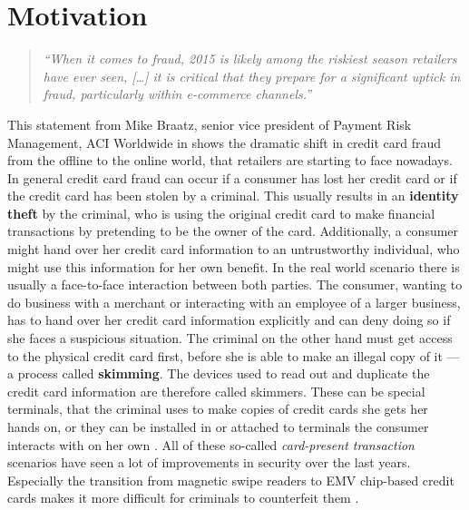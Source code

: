 
\section{Motivation}
\label{sec:motivation}

\begin{quotation}
    \textit{\enquote{When it comes to fraud, 2015 is likely among the riskiest season retailers have ever seen, […]
    it is critical that they prepare for a significant uptick in fraud, particularly within e-commerce channels.} \citep{Reuters2015}}
\end{quotation}
This statement from Mike Braatz, senior vice president of Payment Risk Management, ACI Worldwide in \citep{Reuters2015} shows the dramatic shift in credit card fraud from the offline to the online world, that retailers are starting to face nowadays. \\

In general credit card fraud can occur if a consumer has lost her credit card or if the credit card has been stolen by a criminal. This usually results in an \textbf{identity theft} by the criminal, who is using the original credit card to make financial transactions by pretending to be the owner of the card. Additionally, a consumer might hand over her credit card information to an untrustworthy individual, who might use this information for her own benefit. In the real world scenario there is usually a face-to-face interaction between both parties. The consumer, wanting to do business with a merchant or interacting with an employee of a larger business, has to hand over her credit card information explicitly and can deny doing so if she faces a suspicious situation. The criminal on the other hand must get access to the physical credit card first, before she is able to make an illegal copy of it --- a process called \textbf{skimming}. The devices used to read out and duplicate the credit card information are therefore called skimmers. These can be special terminals, that the criminal uses to make copies of credit cards she gets her hands on, or they can be installed in or attached to terminals the consumer interacts with on her own \citep{ConsumerAction2009}. All of these so-called \textit{card-present transaction} scenarios have seen a lot of improvements in security over the last years. Especially the transition from magnetic swipe readers to EMV chip-based credit cards makes it more difficult for criminals to counterfeit them \citep{Lewis2015}. \\

